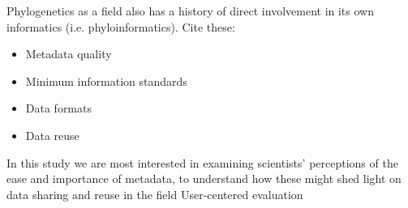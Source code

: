 \documentclass[12pt]{scrartcl}
\begin{document}
Phylogenetics as a field also has a history of direct involvement in its own informatics (i.e. phyloinformatics). %
Cite these:
\begin{itemize}
	\item Metadata quality
	\item Minimum information standards \citep{Leebens-Mack2006}
	\item Data formats \citep{Vos2012}
	\item Data reuse \citep{Stoltzfus2012}
\end{itemize}

In this study we are most interested in examining scientists' perceptions of the ease and importance of metadata, to understand how these might shed light on data sharing and reuse in the field
User-centered evaluation
\end{document}
